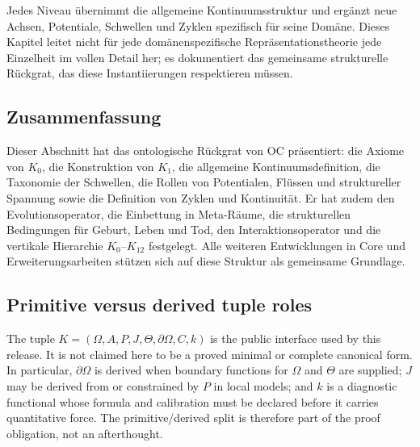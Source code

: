 Jedes Niveau übernimmt die allgemeine Kontinuumsstruktur und ergänzt neue
Achsen, Potentiale, Schwellen und Zyklen spezifisch für seine Domäne.
Dieses Kapitel leitet nicht für jede domänenspezifische Repräsentationstheorie
jede Einzelheit im vollen Detail her; es dokumentiert das gemeinsame
strukturelle Rückgrat, das diese Instantiierungen respektieren müssen.

\subsection{Zusammenfassung}

Dieser Abschnitt hat das ontologische Rückgrat von OC präsentiert: die Axiome von
\(K_0\), die Konstruktion von \(K_1\), die allgemeine Kontinuumsdefinition,
die Taxonomie der Schwellen, die Rollen von Potentialen, Flüssen und
struktureller Spannung sowie die Definition von Zyklen und Kontinuität.
Er hat zudem den Evolutionsoperator, die Einbettung in Meta-Räume,
die strukturellen Bedingungen für Geburt, Leben und Tod, den Interaktionsoperator
und die vertikale Hierarchie \(K_0\)–\(K_{12}\) festgelegt.
Alle weiteren Entwicklungen in Core und Erweiterungsarbeiten stützen sich auf
diese Struktur als gemeinsame Grundlage.


\subsection{Primitive versus derived tuple roles}
\label{sec:oc13-tuple-primitive-derived-v3}

The tuple \(K=(\Omega,A,P,J,\Theta,\partial\Omega,C,k)\) is the public interface
used by this release. It is not claimed here to be a proved minimal or complete
canonical form. In particular, \(\partial\Omega\) is derived when boundary
functions for \(\Omega\) and \(\Theta\) are supplied; \(J\) may be derived from
or constrained by \(P\) in local models; and \(k\) is a diagnostic functional
whose formula and calibration must be declared before it carries quantitative
force. The primitive/derived split is therefore part of the proof obligation,
not an afterthought.
